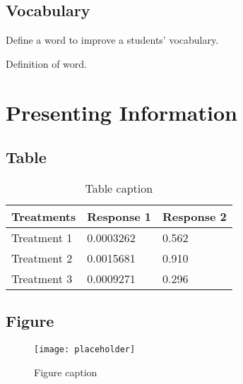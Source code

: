 \documentclass[11pt,fleqn,oneside,openany]{book} %
\begin{document}

\section{Vocabulary}

Define a word to improve a students' vocabulary.

\begin{vocabulary}[Word]
Definition of word.
\end{vocabulary}



\chapter{Presenting Information}

\section{Table}

\begin{table}[h]
\centering
\begin{tabular}{l l l}
\toprule
\textbf{Treatments} & \textbf{Response 1} & \textbf{Response 2}\\
\midrule
Treatment 1 & 0.0003262 & 0.562 \\
Treatment 2 & 0.0015681 & 0.910 \\
Treatment 3 & 0.0009271 & 0.296 \\
\bottomrule
\end{tabular}
\caption{Table caption}
\end{table}


\section{Figure}

\begin{figure}[h]
\centering\texttt{[image: placeholder]}
\caption{Figure caption}
\end{figure}
\end{document}
